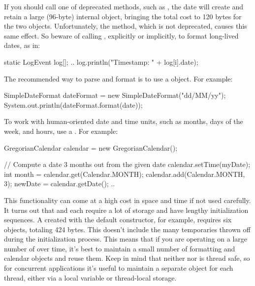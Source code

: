 If you should call one of  deprecated methods, such as
, the date will create and retain
a large (96-byte) internal object, bringing the total cost to 120 bytes for
the two objects. Unfortunately, the  method, which is not
deprecated, causes this same effect. So beware of calling ,
explicitly or implicitly, to format long-lived dates, as in:

\begin{shortlisting}
	static LogEvent log[]; 
	..
	log.println("Timestamp: " + log[i].date);
\end{shortlisting}

The recommended way to parse and format  is 
to use a  object. For example:

\begin{shortlisting}
    SimpleDateFormat dateFormat = 
    	new SimpleDateFormat("dd/MM/yy"); 
    System.out.println(dateFormat.format(date)); 
\end{shortlisting}

To work with human-oriented date and time units, such as
months, days of the week, and hours, use a . For example:

\begin{shortlisting}

	GregorianCalendar calendar = new GregorianCalendar();
	
	// Compute a date 3 months out from the given date
    calendar.setTime(myDate);
	int month = calendar.get(Calendar.MONTH); 
	calendar.add(Calendar.MONTH, 3); 
	newDate = calendar.getDate();
	..
    
\end{shortlisting}

This functionality can come at a high cost in space and time if not
used carefully. It turns out that  and
 each require a lot of storage and have lengthy
initialization sequences.
A  created with the default constructor, for
example, requires six objects, totaling 424 bytes. This doesn't include the many
temporaries thrown off during the initialization process.  This means that if
you are operating on a large number of  over time, it's best to
maintain a small number of formatting and calendar objects and reuse them.  Keep in mind that neither
 nor  is thread safe, so for
concurrent applications it's useful to maintain a separate object for each
thread, either via a local variable or thread-local storage.

